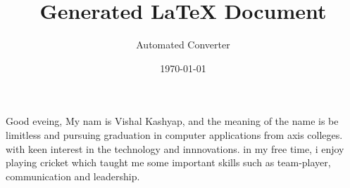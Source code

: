 \documentclass{article}
\title{Generated LaTeX Document}
\author{Automated Converter}
\date{\today}
\begin{document}
\maketitle

Good eveing,
My nam is Vishal Kashyap, and the meaning of the name is be limitless and
pursuing graduation in computer applications from axis colleges.
with keen interest in the technology and innnovations.
in my free time, i enjoy playing cricket which taught me some important
skills such as team-player, communication and leadership.
\end{document}
